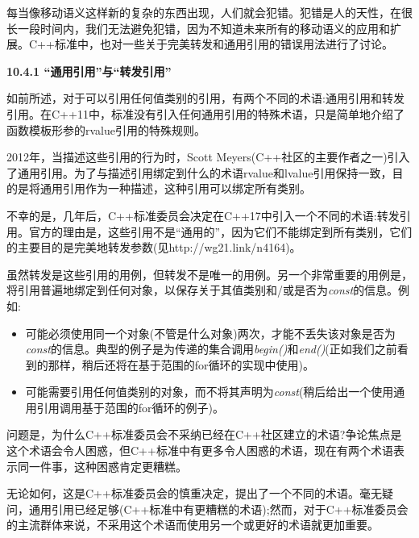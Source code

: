 每当像移动语义这样新的复杂的东西出现，人们就会犯错。犯错是人的天性，在很长一段时间内，我们无法避免犯错，因为不知道未来所有的移动语义的应用和扩展。C++标准中，也对一些关于完美转发和通用引用的错误用法进行了讨论。\par

\hspace*{\fill} \par %
\textbf{10.4.1 “通用引用”与“转发引用”}

如前所述，对于可以引用任何值类别的引用，有两个不同的术语:通用引用和转发引用。在C++11中，标准没有引入任何通用引用的特殊术语，只是简单地介绍了函数模板形参的rvalue引用的特殊规则。\par

2012年，当描述这些引用的行为时，Scott Meyers(C++社区的主要作者之一)引入了通用引用。为了与描述引用绑定到什么的术语rvalue和lvalue引用保持一致，目的是将通用引用作为一种描述，这种引用可以绑定所有类别。\par

不幸的是，几年后，C++标准委员会决定在C++17中引入一个不同的术语:转发引用。官方的理由是，这些引用不是“通用的”，因为它们不能绑定到所有类别，它们的主要目的是完美地转发参数(见http://wg21.link/n4164)。\par

虽然转发是这些引用的用例，但转发不是唯一的用例。另一个非常重要的用例是，将引用普遍地绑定到任何对象，以保存关于其值类别和/或是否为\textit{const}的信息。例如:\par

\begin{itemize}
	\item 可能必须使用同一个对象(不管是什么对象)两次，才能不丢失该对象是否为\textit{const}的信息。典型的例子是为传递的集合调用\textit{begin()}和\textit{end()}(正如我们之前看到的那样，稍后还将在基于范围的for循环的实现中使用)。
	\item 可能需要引用任何值类别的对象，而不将其声明为\textit{const}(稍后给出一个使用通用引用调用基于范围的for循环的例子)。
\end{itemize}

问题是，为什么C++标准委员会不采纳已经在C++社区建立的术语?争论焦点是这个术语会令人困惑，但C++标准中有更多令人困惑的术语，现在有两个术语表示同一件事，这种困惑肯定更糟糕。\par

无论如何，这是C++标准委员会的慎重决定，提出了一个不同的术语。毫无疑问，通用引用已经足够(C++标准中有更糟糕的术语);然而，对于C++标准委员会的主流群体来说，不采用这个术语而使用另一个或更好的术语就更加重要。\par

